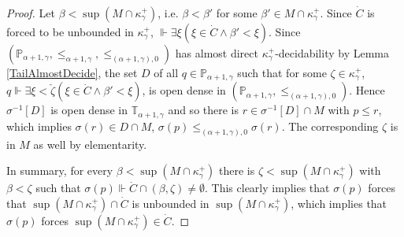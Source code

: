 \documentclass[a4paper]{amsart}
\theoremstyle{definition}
\theoremstyle{remark}
\theoremstyle{plain}
\numberwithin{mydef}{section}
\newcommand{\dP}{\mathbb{P}}
\newcommand{\dT}{\mathbb{T}}
\begin{document}
\begin{proof}
		Let $\beta<\sup(M\cap\kappa_{\gamma}^+)$, i.e. $\beta<\beta'$ for some $\beta'\in M\cap\kappa_{\gamma}^+$. Since $\dot{C}$ is forced to be unbounded in $\kappa_{\gamma}^+$, $\Vdash\exists\xi(\xi\in\dot{C}\wedge\beta'<\xi)$. Since $(\dP_{\alpha+1,\gamma},\leq_{\alpha+1,\gamma},\leq_{(\alpha+1,\gamma),0})$ has almost direct $\kappa_{\gamma}^+$-decidability by Lemma \ref{TailAlmostDecide}, the set $D$ of all $q\in\dP_{\alpha+1,\gamma}$ such that for some $\zeta\in\kappa_{\gamma}^+$, $q\Vdash\exists\xi<\check{\zeta}(\xi\in\dot{C}\wedge\beta'<\xi)$, is open dense in $(\dP_{\alpha+1,\gamma},\leq_{(\alpha+1,\gamma),0})$. Hence $\sigma^{-1}[D]$ is open dense in $\dT_{\alpha+1,\gamma}$ and so there is $r\in\sigma^{-1}[D]\cap M$ with $p\leq r$, which implies $\sigma(r)\in D\cap M$, $\sigma(p)\leq_{(\alpha+1,\gamma),0}\sigma(r)$. The corresponding $\zeta$ is in $M$ as well by elementarity.
		
		In summary, for every $\beta<\sup(M\cap\kappa_{\gamma}^+)$ there is $\zeta<\sup(M\cap\kappa_{\gamma}^+)$ with $\beta<\zeta$ such that $\sigma(p)\Vdash\dot{C}\cap(\beta,\zeta)\neq\emptyset$. This clearly implies that $\sigma(p)$ forces that $\sup(M\cap\kappa_{\gamma}^+)\cap\dot{C}$ is unbounded in $\sup(M\cap\kappa_{\gamma}^+)$, which implies that $\sigma(p)$ forces $\sup(M\cap\kappa_{\gamma}^+)\in\dot{C}$.
	\end{proof}
	
	\printbibliography
\end{document}
